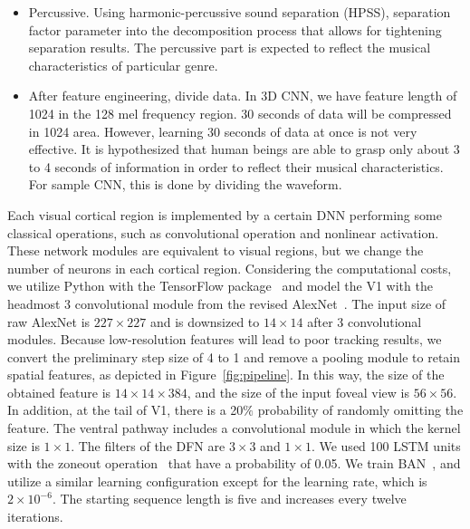 \documentclass[journal]{IEEEtran}
\begin{document}
\begin{itemize}
	\item Percussive.
	Using harmonic-percussive sound separation (HPSS), separation factor parameter into the decomposition process that allows for tightening separation results.
	The percussive part is expected to reflect the musical characteristics of particular genre.
	
	\item After feature engineering, divide data.
	In 3D CNN, we have feature length of 1024 in the 128 mel frequency region.
	30 seconds of data will be compressed in 1024 area.
	However, learning 30 seconds of data at once is not very effective.
	It is hypothesized that human beings are able to grasp only about 3 to 4 seconds of information in order to reflect their musical characteristics.
	For sample CNN, this is done by dividing the waveform.
\end{itemize}


Each visual cortical region is implemented by a certain DNN performing some classical operations, such as convolutional operation and nonlinear activation. 
These network modules are equivalent to visual regions, but we change the number of neurons in each cortical region.
Considering the computational costs, we utilize Python with the TensorFlow package~\cite{abadi2015tensorflow} 
and model the V1 with the headmost 3 convolutional module from the revised AlexNet~\cite{imagenet}. 
The input size of raw AlexNet is $227 \times 227$ and is downsized to $14 \times 14$ after 3 convolutional modules. 
Because low-resolution features will lead to poor tracking results, 
we convert the preliminary step size of 4 to 1 
and remove a pooling module to retain spatial features, as depicted in Figure~\ref{fig:pipeline}. 
In this way, the size of the obtained feature is $14 \times 14 \times 384$, and the size of the input foveal view is $56 \times 56$.
In addition, at the tail of V1, there is a 20$\%$ probability of randomly omitting the feature. 
The ventral pathway includes a convolutional module in which the kernel size is $1 \times 1$. 
The filters of the DFN are $3 \times 3$ and $1 \times 1$.
We used 100 LSTM units with the zoneout operation~\cite{zoneout} that have a probability of 0.05.
We train BAN~\cite{curriculum}, and utilize a similar learning configuration except for the learning rate, which is $2 \times 10 ^{-6}$.
The starting sequence length is five and increases every twelve iterations. 
\end{document}

